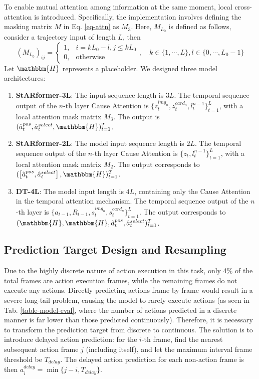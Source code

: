 \documentclass[runningheads]{llncs}
\begin{document}
To enable mutual attention among information at the same moment,
local cross-attention is introduced. Specifically,
the implementation involves defining the masking matrix \( M \) in Eq. \eqref{eq-attn} as \( M_{3} \).
Here, $M_{L_0}$ is defined as follows, consider a trajectory input of length $L$, then
\begin{equation}
  (M_{L_0})_{ij} = \begin{cases}
    1, & i=kL_0-l, j \leq kL_0 \\
    0, & \text{otherwise}
  \end{cases},\quad k \in \{1, \cdots, L\}, l \in \{0, \cdots, L_0-1\}
\end{equation}
Let $\mathbbm{H}$ represents a placeholder. We designed three model architectures:
\begin{enumerate}
  \item \textbf{StARformer-3L}: The input sequence length is $3L$.
  The temporal sequence output of the $n$-th layer Cause Attention is $\{z_t^{img_n}, z_t^{card_n}, l_t^{n-1}\}_{t=1}^L$,
  with a local attention mask matrix $M_3$. The output is $(\hat{a}_t^{pos}, \hat{a}_t^{select}, \mathbbm{H})_{t=1}^T$.
  \item \textbf{StARformer-2L}: The model input sequence length is $2L$.
  The temporal sequence output of the $n$-th layer Cause Attention is $\{z_t, l_t^{n-1}\}_{t=1}^L$,
  with a local attention mask matrix $M_2$. The output corresponds to $(\left[\hat{a}_t^{pos}, \hat{a}_t^{select}\right], \mathbbm{H})_{t=1}^T$.
  \item \textbf{DT-4L}: The model input length is $4L$, containing only the Cause Attention in the temporal attention mechanism.
  The temporal sequence output of the $n$-th layer is $\{a_{t-1}, R_{t-1}, s_t^{img_n}, s_t^{card_n}\}_{t=1}^L$.
  The output corresponds to $(\mathbbm{H}, \mathbbm{H}, \hat{a}_t^{pos}, \hat{a}_t^{select})_{t=1}^T$.
\end{enumerate}

\subsection{Prediction Target Design and Resampling}
Due to the highly discrete nature of action execution in this task, only 4\% of the total frames are action execution frames,
while the remaining frames do not execute any actions. Directly predicting actions frame by frame would result in a severe long-tail problem,
causing the model to rarely execute actions (as seen in Tab. \ref{table-model-eval},
where the number of actions predicted in a discrete manner is far lower than those predicted continuously).
Therefore, it is necessary to transform the prediction target from discrete to continuous.
The solution is to introduce delayed action prediction: for the $i$-th frame,
find the nearest subsequent action frame $j$ (including itself), and let the maximum interval frame threshold be $T_{delay}$.
The delayed action prediction for each non-action frame is then $a^{delay}_{i} = \min\{j-i, T_{delay}\}$.
\end{document}
